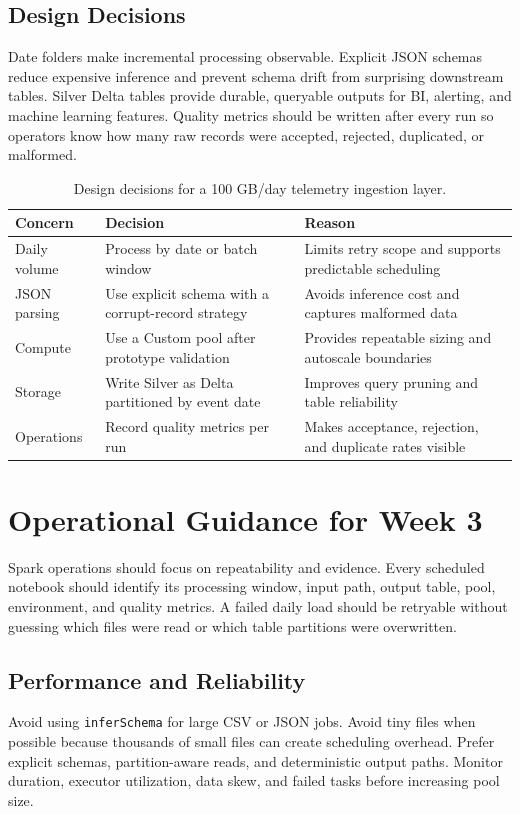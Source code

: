 \subsection{Design Decisions}
Date folders make incremental processing observable. Explicit JSON schemas reduce expensive inference and prevent schema drift from surprising downstream tables. Silver Delta tables provide durable, queryable outputs for BI, alerting, and machine learning features. Quality metrics should be written after every run so operators know how many raw records were accepted, rejected, duplicated, or malformed.

\begin{table}[H]
\centering
\small
\begin{tabular}{@{}p{3.3cm}p{5.0cm}p{5.0cm}@{}}
\toprule
\textbf{Concern} & \textbf{Decision} & \textbf{Reason} \\
\midrule
Daily volume & Process by date or batch window & Limits retry scope and supports predictable scheduling \\
JSON parsing & Use explicit schema with a corrupt-record strategy & Avoids inference cost and captures malformed data \\
Compute & Use a Custom pool after prototype validation & Provides repeatable sizing and autoscale boundaries \\
Storage & Write Silver as Delta partitioned by event date & Improves query pruning and table reliability \\
Operations & Record quality metrics per run & Makes acceptance, rejection, and duplicate rates visible \\
\bottomrule
\end{tabular}
\caption{Design decisions for a 100 GB/day telemetry ingestion layer.}
\label{tab:chapter3-telemetry-decisions}
\end{table}

\section{Operational Guidance for Week 3}
Spark operations should focus on repeatability and evidence. Every scheduled notebook should identify its processing window, input path, output table, pool, environment, and quality metrics. A failed daily load should be retryable without guessing which files were read or which table partitions were overwritten.

\subsection{Performance and Reliability}
Avoid using \texttt{inferSchema} for large CSV or JSON jobs. Avoid tiny files when possible because thousands of small files can create scheduling overhead. Prefer explicit schemas, partition-aware reads, and deterministic output paths. Monitor duration, executor utilization, data skew, and failed tasks before increasing pool size.

